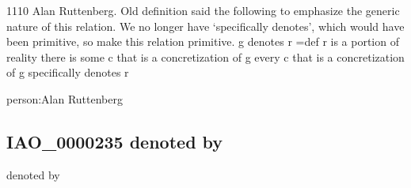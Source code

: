 \documentclass[letterpaper,10pt,english]{sphinxmanual}
\begin{document}
\begin{sphinxShadowBox}

\sphinxhyphen{}11\sphinxhyphen{}10 Alan Ruttenberg. Old definition said the following to emphasize the generic nature of this relation. We no longer have ‘specifically denotes’, which would have been primitive, so make this relation primitive.
g denotes r =def
r is a portion of reality
there is some c that is a concretization of g
every c that is a concretization of g specifically denotes r
\end{sphinxShadowBox}

\begin{sphinxShadowBox}

\sphinxAtStartPar
{}
\end{sphinxShadowBox}

\begin{sphinxShadowBox}

\sphinxAtStartPar
person:Alan Ruttenberg
\end{sphinxShadowBox}
\begin{quote}

\ignorespaces \end{quote}


\subsection{IAO\_0000235 \sphinxhyphen{} denoted by}
\label{\detokenize{doc-IAO_0000235:iao-0000235-denoted-by}}\label{\detokenize{doc-IAO_0000235:index-0}}\label{\detokenize{doc-IAO_0000235::doc}}
\begin{sphinxShadowBox}

\sphinxAtStartPar
denoted by
\end{sphinxShadowBox}

\begin{sphinxShadowBox}

\sphinxAtStartPar
{\hyperref[\detokenize{doc-IAO_0000136::doc}]{}}
\end{sphinxShadowBox}
\end{document}
